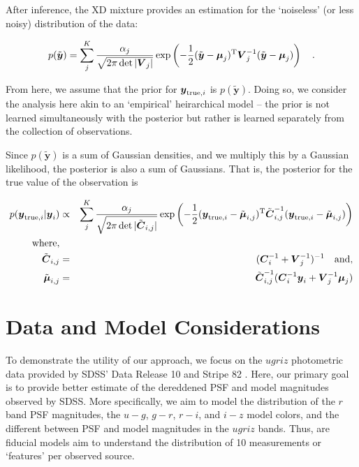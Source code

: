 \documentclass[12pt,preprint]{aastex}
\newcommand{\datavector}[1]{\boldsymbol{#1}}
\newcommand{\data}{\datavector{y}}
\newcommand{\datum}{\data_i}
\newcommand{\truedatum}{\data_{{\rm true}, i}}
\newcommand{\noiselessdata}{\tilde{\data}}
\newcommand{\xdcov}{\datavector{V}_j}
\newcommand{\datacov}{\datavector{C}}
\newcommand{\postcov}{\tilde{\datacov}_{i, j}}
\newcommand{\vmu}{\datavector{\mu}}
\newcommand{\postmu}{\tilde{\vmu}_{i, j}}
\newcommand{\datumcov}{\datacov_i}
\newcommand{\transpose}{{\rm T}}
\begin{document}
After inference, the XD mixture provides an estimation for the `noiseless' (or
less noisy) distribution of the data:

\begin{eqnarray}\displaystyle
p(\noiselessdata) = \sum_j^K \frac{\alpha_j}{\sqrt{2\pi\det{|\xdcov|}}} \exp \left (-\frac{1}{2}(\noiselessdata - \vmu_j)^\transpose \xdcov^{-1}(\noiselessdata - \vmu_j) \right )
\quad .
\label{eqn:noiseless}
\end{eqnarray}

\noindent From here, we assume that the prior for $\truedatum$ is
$p(\noiselessdata)$.  Doing so, we consider the analysis here akin to an 
`empirical' heirarchical model -- the prior is not learned simultaneously with
the posterior but rather is learned separately from the collection of
observations.

Since $p(\noiselessdata)$ is a sum of Gaussian densities, and we multiply this
by a Gaussian likelihood, the posterior is also a sum of Gaussians.  That is,
the posterior for the true value of the observation is

\begin{eqnarray}\displaystyle
p(\truedatum | \datum) & \propto & \sum_j^K \frac{\alpha_j}{\sqrt{2\pi\det{|\postcov|}}} \exp \left (-\frac{1}{2}(\truedatum - \postmu)^\transpose \postcov^{-1}(\truedatum - \postmu) \right ) \\
{\rm where,}\\
\postcov & = & (\datumcov^{-1} + \xdcov^{-1})^{-1} \quad {\rm and,} \\
\postmu & = &  \postcov^{-1} (\datumcov^{-1} \datum + \xdcov^{-1} \vmu_j)
\label{eqn:posterior}
\end{eqnarray}

\section{Data and Model Considerations}

To demonstrate the utility of our approach, we focus on the $ugriz$
photometric data provided by SDSS' Data Release 10 \citep[DR10,][]{?} and
Stripe 82 \citep[S82,][]{annis14, others?}.  Here, our primary goal is to
provide better estimate of the dereddened PSF and model magnitudes observed by
SDSS.  More specifically, we aim to model the distribution of the $r$ band PSF
magnitudes, the $u-g$, $g-r$, $r-i$, and $i-z$ model colors, and the different
between PSF and model magnitudes in the $ugriz$ bands.  Thus, are fiducial 
models aim to understand the distribution of 10 measurements or `features' per 
observed source.
\end{document}
